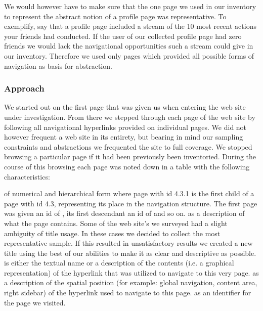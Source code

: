 We would however have to make sure that the one page we used in our inventory
to represent the abstract notion of a profile page was representative. To
exemplify, say that a profile page included a stream of the 10 most recent
actions your friends had conducted. If the user of our collected profile page
had zero friends we would lack the navigational opportunities such a stream
could give in our inventory. Therefore we used only pages which provided
all possible forms of navigation as basis for abstraction.

\subsubsection{Approach}

We started out on the first page that was given us when entering the web site
under investigation. From there we stepped through each page of the web site
by following all navigational hyperlinks provided on individual pages.
We did not however frequent a web site in its entirety, but bearing in mind
our sampling constraints and abstractions we frequented the site to full
coverage. We stopped browsing a particular page if it%
had been previously been inventoried. During the course of this browsing
each page was noted down in a table with the following characteristics:

\begin{enum}
   of numerical and hierarchical form where page with id
    4.3.1 is the first child of a page with id 4.3, representing its place in
    the navigation structure. The first page was given an id of ,
    its first descendant an id of  and so on.
   as a description of what the page contains. Some of the
    web site's we surveyed had a slight ambiguity of title usage. In these
    cases we decided to collect the most representative sample.%
    If this resulted in unsatisfactory results we created a new title using
    the best of our abilities to make it as clear and descriptive as possible.
   is either the textual name or a description of the
    contents (i.e. a graphical representation) of the hyperlink that was
    utilized to navigate to this very page.
   as a description of the spatial position
    (for example: global navigation, content area, right sidebar) of the
    hyperlink used to navigate to this page.
   as an identifier for the page we visited.
\end{enum}

